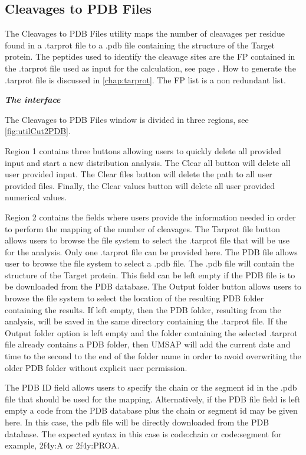 \subsection{Cleavages to PDB Files}
\label{subsec:utilCut2Pdb}

The Cleavages to PDB Files utility maps the number of cleavages per residue found in a .tarprot file to a .pdb file containing the structure of the Target protein. The peptides used to identify the cleavage sites are the FP contained in the .tarprot file used as input for the calculation, see page \pageref{par:tarprotPIP}. How to generate the .tarprot file is discussed in \autoref{chap:tarprot}. The FP list is a non redundant list.

\textit{\textbf{The interface}}

The Cleavages to PDB Files window is divided in three regions, see \autoref{fig:utilCut2PDB}.

Region \num{1} contains three buttons allowing users to quickly delete all provided input and start a new distribution analysis. The Clear all button will delete all user provided input. The Clear files button will delete the path to all user provided files. Finally, the Clear values button will delete all user provided numerical values.

Region \num{2} contains the fields where users provide the information needed in order to perform the mapping of the number of cleavages. The Tarprot file button allows users to browse the file system to select the .tarprot file that will be use for the analysis. Only one .tarprot file can be provided here. The PDB file allows user to browse the file system to select a .pdb file. The .pdb file will contain the structure of the Target protein. This field can be left empty if the PDB file is to be downloaded from the PDB database. The Output folder button allows users to browse the file system to select the location of the resulting PDB folder containing the results. If left empty, then the PDB folder, resulting from the analysis, will be saved in the same directory containing the .tarprot file. If the Output folder option is left empty and the folder containing the selected .tarprot file already contains a PDB folder, then UMSAP will add the current date and time to the second to the end of the folder name in order to avoid overwriting the older PDB folder without explicit user permission.

The PDB ID field allows users to specify the chain or the segment id in the .pdb file that should be used for the mapping. Alternatively, if the PDB file field is left empty a code from the PDB database plus the chain or segment id may be given here. In this case, the pdb file will be directly downloaded from the PDB database. The expected syntax in this case is code:chain or code:segment for example, 2f4y:A or 2f4y:PROA.  

